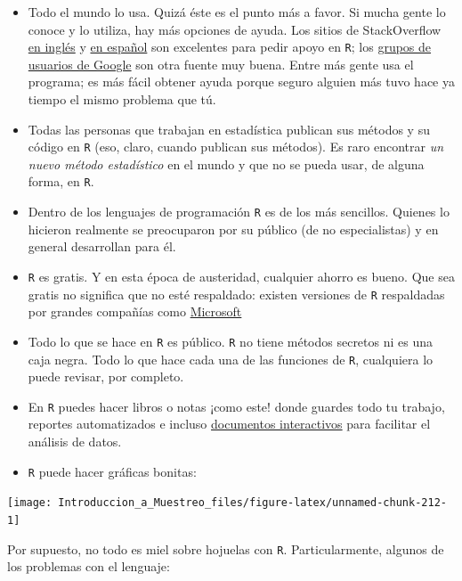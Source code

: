 \documentclass[
]{book}
\begin{document}
\begin{itemize}
\item
  Todo el mundo lo usa. Quizá éste es el punto más a favor. Si mucha gente lo conoce y lo utiliza, hay más opciones de ayuda. Los sitios de StackOverflow \href{https://stackoverflow.com}{en inglés} y \href{https://es.stackoverflow.com}{en español} son excelentes para pedir apoyo en \texttt{R}; los \href{https://groups.google.com/forum/\#!forum/r-help-archive}{grupos de usuarios de Google} son otra fuente muy buena. Entre más gente usa el programa; es más fácil obtener ayuda porque seguro alguien más tuvo hace ya tiempo el mismo problema que tú.
\item
  Todas las personas que trabajan en estadística publican sus métodos y su código en \texttt{R} (eso, claro, cuando publican sus métodos). Es raro encontrar \emph{un nuevo método estadístico} en el mundo y que no se pueda usar, de alguna forma, en \texttt{R}.
\item
  Dentro de los lenguajes de programación \texttt{R} es de los más sencillos. Quienes lo hicieron realmente se preocuparon por su público (de no especialistas) y en general desarrollan para él.
\item
  \texttt{R} es gratis. Y en esta época de austeridad, cualquier ahorro es bueno. Que sea gratis no significa que no esté respaldado: existen versiones de \texttt{R} respaldadas por grandes compañías como \href{https://mran.microsoft.com/open}{Microsoft}
\item
  Todo lo que se hace en \texttt{R} es público. \texttt{R} no tiene métodos secretos ni es una caja negra. Todo lo que hace cada una de las funciones de \texttt{R}, cualquiera lo puede revisar, por completo.
\item
  En \texttt{R} puedes hacer libros o notas ¡como este! donde guardes todo tu trabajo, reportes automatizados e incluso \href{https://gallery.shinyapps.io/086-bus-dashboard/}{documentos interactivos} para facilitar el análisis de datos.
\item
  \texttt{R} puede hacer gráficas bonitas:
\end{itemize}

\begin{center}\texttt{[image: Introduccion\_a\_Muestreo\_files/figure-latex/unnamed-chunk-212-1]} \end{center}

Por supuesto, no todo es miel sobre hojuelas con \texttt{R}. Particularmente, algunos de los problemas con el lenguaje:
\end{document}
